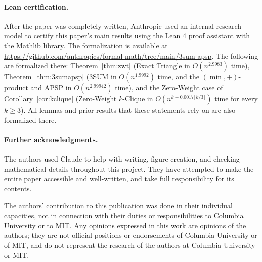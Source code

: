 \documentclass[11pt]{article}
\theoremstyle{definition}
\theoremstyle{remark}
\begin{document}
\paragraph{Lean certification.} After the paper was completely written, Anthropic used an internal research model to certify this paper's main results using the Lean 4 proof assistant with the Mathlib library. The formalization is available at \url{https://github.com/anthropics/formal-math/tree/main/3sum-apsp}. The following are formalized there: Theorem~\ref{thm:zwt} (Exact Triangle in $O(n^{2.9983})$ time), Theorem~\ref{thm:3sumapsp} ($3$SUM in $O(n^{1.9992})$ time, and the $(\min,+)$-product and APSP in $O(n^{2.99942})$ time), and the Zero-Weight case of Corollary~\ref{cor:kclique} (Zero-Weight $k$-Clique in $O(n^{k-0.0017\lfloor k/3\rfloor})$ time for every $k\ge3$). All lemmas and prior results that these statements rely on are also formalized there.

\paragraph{Further acknowledgments.}
The authors used Claude to help with writing, figure creation, and checking mathematical details throughout this project. They have attempted to make the entire paper accessible and well-written, and take full responsibility for its contents.

The authors' contribution to this publication was done in their individual capacities, 
not in connection with their duties
or responsibilities to Columbia University or to MIT. Any opinions expressed in this work are opinions of the authors; they are not official positions or endorsements of Columbia University or of MIT, and do not represent the research of the authors at Columbia University or MIT.




\end{document}
